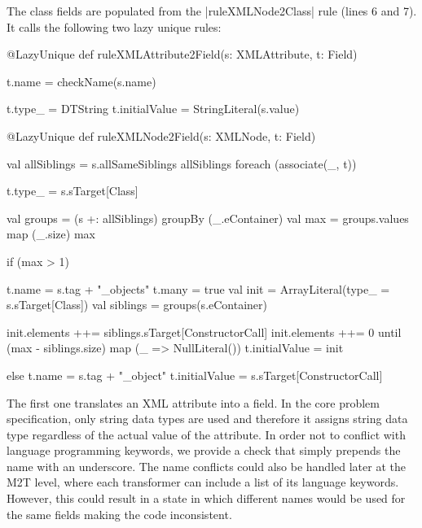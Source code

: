 The class fields are populated from the \Scala|ruleXMLNode2Class| rule (lines 6 and 7).
It calls the following two lazy unique rules:
%
\begin{scalacode}
@LazyUnique
def ruleXMLAttribute2Field(s: XMLAttribute, t: Field) {
  t.name = checkName(s.name)

  t.type_ = DTString
  t.initialValue = StringLiteral(s.value)
}

@LazyUnique
def ruleXMLNode2Field(s: XMLNode, t: Field) {
  val allSiblings = s.allSameSiblings
  allSiblings foreach (associate(_, t))

  t.type_ = s.sTarget[Class]

  val groups = (s +: allSiblings) groupBy (_.eContainer)
  val max = groups.values map (_.size) max

  if (max > 1) {
    t.name = s.tag + "_objects"
    t.many = true
    val init = ArrayLiteral(type_ = s.sTarget[Class])
    val siblings = groups(s.eContainer)
    
    init.elements ++= siblings.sTarget[ConstructorCall]
    init.elements ++= 0 until (max - siblings.size) map (_ => NullLiteral())
    t.initialValue = init
  } else {
    t.name = s.tag + "_object"
    t.initialValue = s.sTarget[ConstructorCall]
  }
}  
\end{scalacode}
%
The first one translates an XML attribute into a field.
In the core problem specification, only string data types are used and therefore it assigns string data type regardless of the actual value of the attribute.
In order not to conflict with language programming keywords, we provide a check that simply prepends the name with an underscore.
The name conflicts could also be handled later at the M2T level, where each transformer can include a list of its language keywords.
However, this could result in a state in which different names would be used for the same fields making the code inconsistent.

